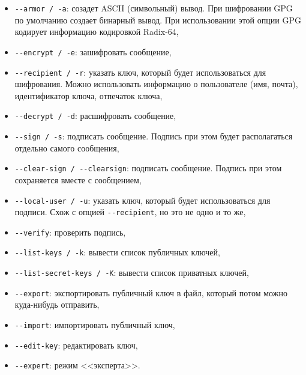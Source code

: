 \documentclass[%
	11pt,
	a4paper,
	utf8,
		]{article}
\begin{document}
\begin{itemize}
	\item \lstinline{--armor / -a}: созадет ASCII (символьный) вывод. При шифровании GPG по умолчанию создает бинарный вывод. При использовании этой опции GPG кодирует информацию кодировкой Radix-64,
	
	\item \lstinline{--encrypt / -e}: зашифровать сообщение,
	
	\item \lstinline{--recipient / -r}: указать ключ, который будет использоваться для шифрования. Можно использовать информацию о пользователе (имя, почта), идентификатор ключа, отпечаток ключа,
	
	\item \lstinline{--decrypt / -d}: расшифровать сообщение,
	
	\item \lstinline{--sign / -s}: подписать сообщение. Подпись при этом будет располагаться отдельно самого сообщения,
	
	\item \lstinline{--clear-sign / --clearsign}: подписать сообщение. Подпись при этом сохраняется вместе с сообщением,
	
	\item \lstinline{--local-user / -u}: указать ключ, который будет использоваться для подписи. Схож с опцией \lstinline{--recipient}, но это не одно и то же,
	
	\item \lstinline{--verify}: проверить подпись,
	
	\item \lstinline{--list-keys / -k}: вывести список публичных ключей,
	
	\item \lstinline{--list-secret-keys / -K}: вывести список приватных ключей,
	
	\item \lstinline{--export}: экспортировать публичный ключ в файл, который потом можно куда-нибудь отправить,
	
	\item \lstinline{--import}: импортировать публичный ключ,
	
	\item \lstinline{--edit-key}: редактировать ключ,
	
	\item \lstinline{--expert}: режим <<эксперта>>.  
\end{itemize}
\end{document}
